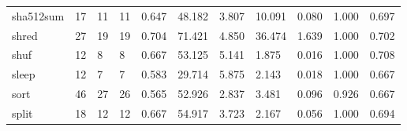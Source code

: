 \begin{longtable}{lp{1.8cm}p{1.8cm}p{1.8cm}p{1.8cm}p{1.8cm}p{1.8cm}p{1.8cm}p{1.8cm}p{1.8cm}p{1.8cm}}
sha512sum &                           17 &                 11 &                                11 &                                      0.647 &                                 48.182 &                                        3.807 &                            10.091 &                                   0.080 &                              1.000 &                                              0.697 \\
shred     &                           27 &                 19 &                                19 &                                      0.704 &                                 71.421 &                                        4.850 &                            36.474 &                                   1.639 &                              1.000 &                                              0.702 \\
shuf      &                           12 &                  8 &                                 8 &                                      0.667 &                                 53.125 &                                        5.141 &                             1.875 &                                   0.016 &                              1.000 &                                              0.708 \\
sleep     &                           12 &                  7 &                                 7 &                                      0.583 &                                 29.714 &                                        5.875 &                             2.143 &                                   0.018 &                              1.000 &                                              0.667 \\
sort      &                           46 &                 27 &                                26 &                                      0.565 &                                 52.926 &                                        2.837 &                             3.481 &                                   0.096 &                              0.926 &                                              0.667 \\
split     &                           18 &                 12 &                                12 &                                      0.667 &                                 54.917 &                                        3.723 &                             2.167 &                                   0.056 &                              1.000 &                                              0.694 \\

\end{longtable}
